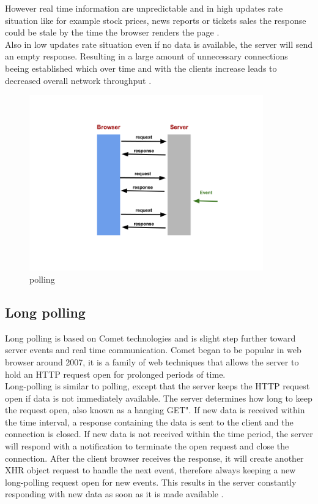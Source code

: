 However real time information are unpredictable and in high updates rate situation like for example stock prices, news reports or tickets sales the response could be stale by the time the browser renders the page \citep{Reference32}.\\
Also in low updates rate situation even if no data is available, the server will send an empty response. Resulting in a large amount of unnecessary connections beeing established which over time and with the clients increase leads to decreased overall network throughput \citep{Reference2}. \\

\begin{figure}[htbp]
	\centering
		\includegraphics[width=0.9\textwidth]{./Figures/polling.png}
	\caption[polling]{polling}
	\label{fig:polling}
\end{figure}

\subsection{Long polling}

Long polling is based on Comet technologies and is slight step further toward server events and real time communication. Comet began to be popular in web browser around 2007, it is a family of web techniques that allows the server to hold an HTTP request open for prolonged periods of time.\\

Long-polling is similar to polling, except that the server keeps the HTTP request open if data is not immediately available. The server determines how long to keep the request open, also known as a hanging GET". If new data is received within the time interval, a response containing the data is sent to the client and the connection is closed. If new data is not received within the time period, the server will respond with a notification to terminate the open request and close the connection. After the client browser receives the response, it will create another XHR object request to handle the next event, therefore always keeping a new long-polling request open for new events. This results in the server constantly responding with new data as soon as it is made available \citep{Reference2}.\\

